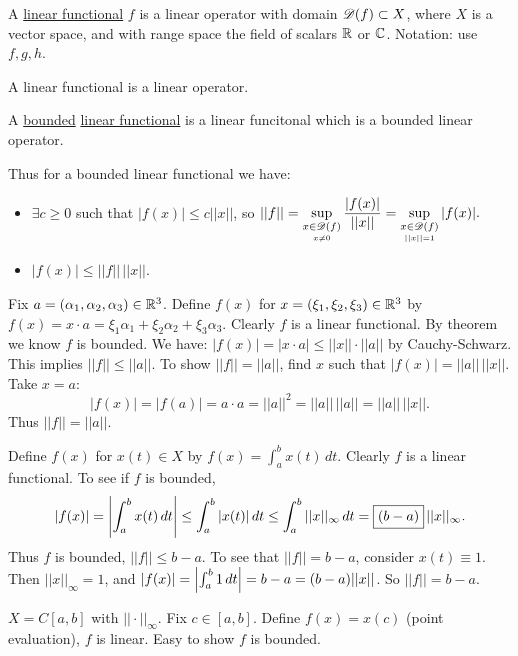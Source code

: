 \documentclass[]{article}
\begin{document}
\begin{definition}
	A \ul{linear functional} $f$ is a linear operator with domain $\mathscr{D}(f)\subset X$, where $X$ is a vector space, and with range space the field of scalars $\mathbb{R}$ or $\mathbb{C}$.
	Notation: use $f,g,h$.
\end{definition}
\begin{note}
	A linear functional is a linear operator.
\end{note}
\begin{definition}
	A \ul{bounded} \ul{linear functional} is a linear funcitonal which is a bounded linear operator.
\end{definition}
	Thus for a bounded linear functional we have:
\begin{itemize}
	\item $\exists c\geq 0$ such that $|f(x)|\leq c||x||$,
		so $\displaystyle ||f|| = \sup_{\underset{x\neq0}{x\in\mathscr{D}(f)}} \frac{|f(x)|}{||x||}
		= \sup_{\underset{||x||=1}{x\in\mathscr{D}(f)}} |f(x)|. $
		\item $|f(x)| \leq ||f||\,||x||$.
\end{itemize}
\begin{example}
	[$X=\mb R^3$ with Euclidean norm] Fix $a=(\alpha_1,\alpha_2,\alpha_3)\in\mathbb{R}^3$.
	Define $f(x)$ for $x=(\xi_1,\xi_2,\xi_3)\in\mathbb{R}^3$ by $f(x) = x\cdot a = \xi_1\alpha_1+\xi_2\alpha_2+\xi_3\alpha_3$.
	Clearly $f$ is a linear functional.
	By theorem we know $f$ is bounded. We have: $|f(x)|=|x\cdot a|\leq ||x||\cdot||a||$ by Cauchy-Schwarz.
	This implies $||f||\leq||a||$. To show $||f||=||a||$, find $x$ such that $|f(x)|=||a||\,||x||$.
	Take $x=a$: $$|f(x)|=|f(a)| = a\cdot a = ||a||^2 = ||a||\,||a|| = ||a||\,||x||.$$
	Thus $||f||=||a||$.
\end{example}
\begin{example}
	[$X= C{[}a,b{]}$ with $||\cdot||_\infty$] Define $f(x)$ for $x(t)\in X$ by $f(x) = \int_a^bx(t)\,dt$.
	Clearly $f$ is a linear functional.
	To see if $f$ is bounded,
	\begin{align*}
		|f(x)| = \left|\int_a^bx(t)\,dt\right|
			   \leq \int_a^b|x(t)|\,dt
			   \leq \int_a^b||x||_\infty\,dt
			   = \fbox{$(b-a)$}\,||x||_\infty.
	\end{align*}
	Thus $f$ is bounded, $||f||\leq b-a$.
	To see that $||f||=b-a$, consider $x(t)\equiv 1$.
	Then $||x||_\infty=1$, and $|f(x)| = \left|\int_a^b1\,dt\right| = b-a = (b-a)||x||$.
	So $||f||=b-a$.
\end{example}
\begin{example}
	$X = C[a,b]$ with $||\cdot||_\infty$. Fix $c\in[a,b]$.
	Define $f(x) = x(c)$ (point evaluation), $f$ is linear. Easy to show $f$ is bounded.
\end{example}
\end{document}
